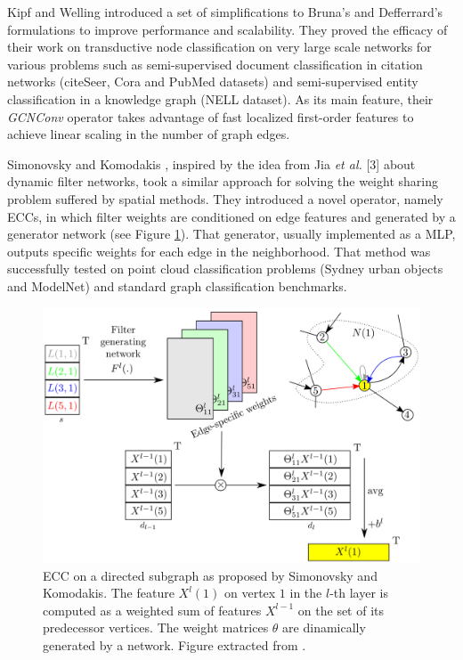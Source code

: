 Kipf and Welling \cite{Kipf2016} introduced a set of simplifications to Bruna's \cite{Bruna2013} and Defferrard's \cite{Defferrard2016} formulations to improve performance and scalability. They proved the efficacy of their work on transductive node classification on very large scale networks for various problems such as semi-supervised document classification in citation networks (citeSeer, Cora and PubMed datasets) and semi-supervised entity classification in a knowledge graph (\acs{NELL} dataset). As its main feature, their \emph{GCNConv} operator takes advantage of fast localized first-order features to achieve linear scaling in the number of graph edges.

Simonovsky and Komodakis \cite{Simonovsky2017}, inspired by the idea from Jia \emph{et al.} [3] about dynamic filter networks, took a similar approach for solving the weight sharing problem suffered by spatial methods. They introduced a novel operator, namely \acp{ECC}, in which filter weights are conditioned on edge features and generated by a generator network (see Figure \ref{fig:tactile:simonovsky}). That generator, usually implemented as a \ac{MLP}, outputs specific weights for each edge in the neighborhood. That method was successfully tested on point cloud classification problems (Sydney urban objects and ModelNet) and standard graph classification benchmarks.

\begin{figure}[!htb]
    \centering
    \includegraphics[width=0.95\linewidth]{Figures/Tactile/simonovksy}
    \caption{\ac{ECC} on a directed subgraph as proposed by Simonovsky and Komodakis. The feature $X^l(1)$ on vertex $1$ in the $l$-th layer is computed as a weighted sum of features $X^{l-1}$ on the set of its predecessor vertices. The weight matrices $\theta$ are dinamically generated by a network. Figure extracted from \cite{Simonovsky2017}.}
    \label{fig:tactile:simonovsky}
\end{figure}

